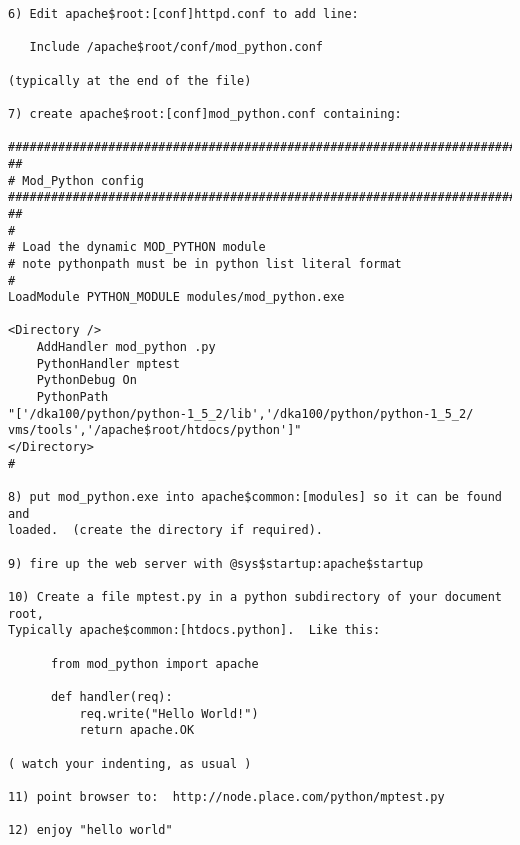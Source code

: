 \begin{verbatim}
6) Edit apache$root:[conf]httpd.conf to add line:

   Include /apache$root/conf/mod_python.conf

(typically at the end of the file)

7) create apache$root:[conf]mod_python.conf containing:

############################################################################
##
# Mod_Python config
############################################################################
##
#
# Load the dynamic MOD_PYTHON module
# note pythonpath must be in python list literal format
#
LoadModule PYTHON_MODULE modules/mod_python.exe

<Directory />
    AddHandler mod_python .py
    PythonHandler mptest
    PythonDebug On
    PythonPath
"['/dka100/python/python-1_5_2/lib','/dka100/python/python-1_5_2/
vms/tools','/apache$root/htdocs/python']"
</Directory>
#

8) put mod_python.exe into apache$common:[modules] so it can be found and
loaded.  (create the directory if required).  

9) fire up the web server with @sys$startup:apache$startup

10) Create a file mptest.py in a python subdirectory of your document root,  
Typically apache$common:[htdocs.python].  Like this:

      from mod_python import apache

      def handler(req):
          req.write("Hello World!")
          return apache.OK 

( watch your indenting, as usual )

11) point browser to:  http://node.place.com/python/mptest.py

12) enjoy "hello world"
\end{verbatim}
